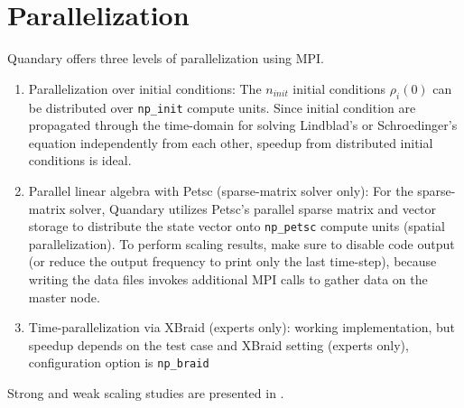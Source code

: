 \documentclass[11pt]{article}
\begin{document}
    \section{Parallelization}
    Quandary offers three levels of parallelization using MPI. 
    \begin{enumerate}
    \item Parallelization over initial conditions: The $n_{init}$ initial conditions $\rho_i(0)$ can be distributed over \texttt{np\_init} compute units. Since initial condition are propagated through the time-domain for solving Lindblad's or Schroedinger's equation independently from each other, speedup from distributed initial conditions is ideal. 
    \item Parallel linear algebra with Petsc (sparse-matrix solver only): For the sparse-matrix solver, Quandary utilizes Petsc's parallel sparse matrix and vector storage to distribute the state vector onto \texttt{np\_petsc} compute units (spatial parallelization). To perform scaling results, make sure to disable code output (or reduce the output frequency to print only the last time-step), because writing the data files invokes additional MPI calls to gather data on the master node.
    \item Time-parallelization via XBraid (experts only): working implementation, but
      speedup depends on the test case and XBraid setting (experts only),
      configuration option is \texttt{np\_braid}
    \end{enumerate}
    Strong and weak scaling studies are presented in \cite{guenther2021quantum}.
\end{document}
